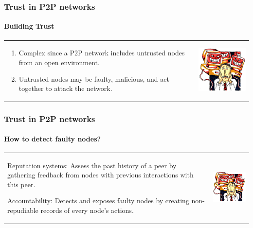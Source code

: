 \documentclass[12pt]{beamer}
\begin{document}
  \begin{frame}
  \frametitle{Trust in P2P networks}
  \framesubtitle{Building Trust}
  \begin{table}
  \begin{tabular}{p{7cm}p{3cm}}
  \begin{enumerate}
      \item Complex since a P2P network includes untrusted nodes from an open environment.
      \item Untrusted nodes may be faulty, malicious, and act together to attack the network.
  \end{enumerate}
  &
  \vspace{1.5cm}
  \includegraphics[width=4cm]{../../presentacion/img/malicious}\\
  \end{tabular}
  \end{table}
  \end{frame}
  
  \begin{frame}
  \frametitle{Trust in P2P networks}
  \framesubtitle{How to detect faulty nodes?}
  \begin{table}
  \begin{tabular}{p{7cm}p{3cm}}
  \begin{description}
      \item{Reputation systems:} Assess the past history of a
  peer by gathering feedback from nodes with previous interactions with this
  peer.
      \item{Accountability:} Detects and exposes faulty nodes by
  creating non-repudiable records of every node’s actions.
  \end{description}
  &
  \vspace{1.5cm}
  \includegraphics[width=4cm]{../../presentacion/img/malicious}\\
  \end{tabular}
  \end{table}
  \end{frame}
  
\end{document}
